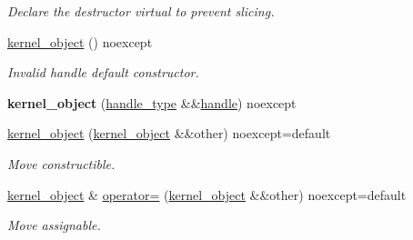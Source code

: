 \begin{DoxyCompactItemize}
\begin{DoxyCompactList}\small\item\em Declare the destructor virtual to prevent slicing. \end{DoxyCompactList}\item 
\mbox{\label{classdistant_1_1kernel__objects_1_1kernel__object_a4c301e6f3c9df1ad43f803907fc20150}} 
\mbox{\hyperlink{classdistant_1_1kernel__objects_1_1kernel__object_a4c301e6f3c9df1ad43f803907fc20150}{kernel\+\_\+object}} () noexcept
\begin{DoxyCompactList}\small\item\em Invalid handle default constructor. \end{DoxyCompactList}\item 
\mbox{\label{classdistant_1_1kernel__objects_1_1kernel__object_a7a192cbe9a25c132506a39ea9f3af93a}} 
{\bfseries kernel\+\_\+object} (\mbox{\hyperlink{classdistant_1_1handle}{handle\+\_\+type}} \&\&\mbox{\hyperlink{classdistant_1_1handle}{handle}}) noexcept
\item 
\mbox{\label{classdistant_1_1kernel__objects_1_1kernel__object_a2e6dfdf7488d70a99b3066b3568c1c23}} 
\mbox{\hyperlink{classdistant_1_1kernel__objects_1_1kernel__object_a2e6dfdf7488d70a99b3066b3568c1c23}{kernel\+\_\+object}} (\mbox{\hyperlink{classdistant_1_1kernel__objects_1_1kernel__object}{kernel\+\_\+object}} \&\&other) noexcept=default
\begin{DoxyCompactList}\small\item\em Move constructible. \end{DoxyCompactList}\item 
\mbox{\label{classdistant_1_1kernel__objects_1_1kernel__object_ae6ecda6a08c6cd9a5e9ac6740d549644}} 
\mbox{\hyperlink{classdistant_1_1kernel__objects_1_1kernel__object}{kernel\+\_\+object}} \& \mbox{\hyperlink{classdistant_1_1kernel__objects_1_1kernel__object_ae6ecda6a08c6cd9a5e9ac6740d549644}{operator=}} (\mbox{\hyperlink{classdistant_1_1kernel__objects_1_1kernel__object}{kernel\+\_\+object}} \&\&other) noexcept=default
\begin{DoxyCompactList}\small\item\em Move assignable. \end{DoxyCompactList}\end{DoxyCompactItemize}
